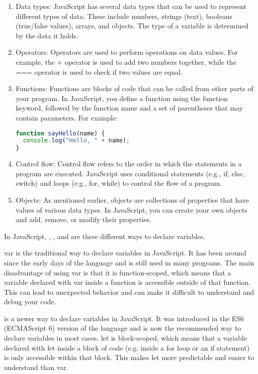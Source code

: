{\begin{enumerate}
\begin{lstlisting}[language=Javascript, nolol, numbers=none]
var x = 5;
\end{lstlisting}
\item Data types: JavaScript has several data types that can be used to represent different types of data. These include numbers, strings (text), booleans (true/false values), arrays, and objects. The type of a variable is determined by the data it holds.
\item Operators: Operators are used to perform operations on data values. For example, the + operator is used to add two numbers together, while the === operator is used to check if two values are equal.
\item Functions: Functions are blocks of code that can be called from other parts of your program. In JavaScript, you define a function using the function keyword, followed by the function name and a set of parentheses that may contain parameters. For example:
\begin{lstlisting}[language=Javascript, numbers=none, caption=sample function]
function sayHello(name) {
  console.log("Hello, " + name);
}
\end{lstlisting}
\item Control flow: Control flow refers to the order in which the statements in a program are executed. JavaScript uses conditional statements (e.g., if, else, switch) and loops (e.g., for, while) to control the flow of a program.
\item Objects: As mentioned earlier, objects are collections of properties that have values of various data types. In JavaScript, you can create your own objects and add, remove, or modify their properties.
\end{enumerate}

In JavaScript, , , and  are three different ways to declare variables.

var is the traditional way to declare variables in JavaScript. It has been around since the early days of the language and is still used in many programs. The main disadvantage of using var is that it is function-scoped, which means that a variable declared with var inside a function is accessible outside of that function. This can lead to unexpected behavior and can make it difficult to understand and debug your code.

 is a newer way to declare variables in JavaScript. It was introduced in the ES6 (ECMAScript 6) version of the language and is now the recommended way to declare variables in most cases. let is block-scoped, which means that a variable declared with let inside a block of code (e.g. inside a for loop or an if statement) is only accessible within that block. This makes let more predictable and easier to understand than var.

}
